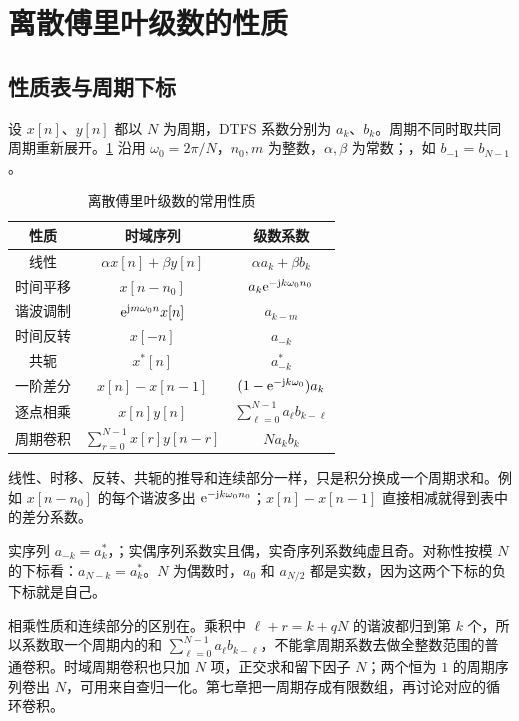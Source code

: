 \section{离散傅里叶级数的性质}
\label{sec:dtfs-properties}

\subsection{性质表与周期下标}
\label{subsec:dtfs-property-table}

设 $x[n]$、$y[n]$ 都以 $N$ 为周期，DTFS 系数分别为 $a_k$、$b_k$。周期不同时取共同周期重新展开。\cref{tab:dtfs-properties} 沿用 $\omega_0=2\pi/N$，$n_0,m$ 为整数，$\alpha,\beta$ 为常数；，如 $b_{-1}=b_{N-1}$。

\begin{table}[H]
  \centering
  \caption{离散傅里叶级数的常用性质}
  \label{tab:dtfs-properties}
  \begingroup
  \renewcommand{\arraystretch}{1.55}
  \begin{tabular}{c c c}
    \toprule
    性质 & 时域序列 & 级数系数 \\
    \midrule
    线性 & $\alpha x[n]+\beta y[n]$ & $\alpha a_k+\beta b_k$ \\
    时间平移 & $x[n-n_0]$ & $a_k\mathrm{e}^{-\mathrm{j} k\omega_0n_0}$ \\
    谐波调制 & $\mathrm{e}^{\mathrm{j} m\omega_0n}x[n]$ & $a_{k-m}$ \\
    时间反转 & $x[-n]$ & $a_{-k}$ \\
    共轭 & $x^*[n]$ & $a_{-k}^*$ \\
    一阶差分 & $x[n]-x[n-1]$ & $(1-\mathrm{e}^{-\mathrm{j} k\omega_0})a_k$ \\
    逐点相乘 & $x[n]y[n]$ & $\displaystyle\sum_{\ell=0}^{N-1}a_\ell b_{k-\ell}$ \\
    周期卷积 & $\displaystyle\sum_{r=0}^{N-1}x[r]y[n-r]$ & $Na_kb_k$ \\
    \bottomrule
  \end{tabular}
  \endgroup
\end{table}

线性、时移、反转、共轭的推导和连续部分一样，只是积分换成一个周期求和。例如 $x[n-n_0]$ 的每个谐波多出 $\mathrm{e}^{-\mathrm{j} k\omega_0n_0}$；$x[n]-x[n-1]$ 直接相减就得到表中的差分系数。

实序列 $a_{-k}=a_k^*$，；实偶序列系数实且偶，实奇序列系数纯虚且奇。对称性按模 $N$ 的下标看：$a_{N-k}=a_k^*$。$N$ 为偶数时，$a_0$ 和 $a_{N/2}$ 都是实数，因为这两个下标的负下标就是自己。

相乘性质和连续部分的区别在。乘积中 $\ell+r=k+qN$ 的谐波都归到第 $k$ 个，所以系数取一个周期内的和 $\sum_{\ell=0}^{N-1}a_\ell b_{k-\ell}$，不能拿周期系数去做全整数范围的普通卷积。时域周期卷积也只加 $N$ 项，正交求和留下因子 $N$；两个恒为 $1$ 的周期序列卷出 $N$，可用来自查归一化。第七章把一周期存成有限数组，再讨论对应的循环卷积。

